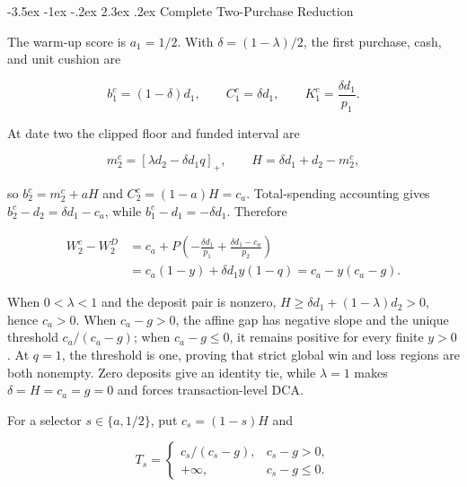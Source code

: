 \documentclass[12pt,a4paper,oneside]{report}
\makeatletter
\renewcommand\section{\@startsection{section}{1}{\z@}%
  {-3.5ex \@plus -1ex \@minus -.2ex}%
  {2.3ex \@plus .2ex}%
  {\normalfont\fontsize{14}{17}\selectfont\bfseries}}
\makeatother
\begin{document}
\section{Complete Two-Purchase Reduction}
\label{sec:appendix-two-purchase}

The warm-up score is $a_1=1/2$. With
$\delta=(1-\lambda)/2$, the first purchase, cash, and unit cushion are

\begin{equation}
  b_1^c=(1-\delta)d_1,
  \qquad C_1^c=\delta d_1,
  \qquad K_1^c=\frac{\delta d_1}{p_1}.
  \label{eq:appendix-two-first-state}
\end{equation}

At date two the clipped floor and funded interval are

\begin{equation}
  m_2^c=\left[\lambda d_2-\delta d_1q\right]_+,
  \qquad H=\delta d_1+d_2-m_2^c,
  \label{eq:appendix-two-floor}
\end{equation}

so $b_2^c=m_2^c+aH$ and $C_2^c=(1-a)H=c_a$. Total-spending
accounting gives $b_2^c-d_2=\delta d_1-c_a$, while
$b_1^c-d_1=-\delta d_1$. Therefore

\begin{align}
  W_2^c-W_2^D
  &=c_a+P\left(-\frac{\delta d_1}{p_1}
       +\frac{\delta d_1-c_a}{p_2}\right) \\
  &=c_a(1-y)+\delta d_1y(1-q)
   =c_a-y(c_a-g).
  \label{eq:appendix-two-gap}
\end{align}

When $0<\lambda<1$ and the deposit pair is nonzero,
$H\geq\delta d_1+(1-\lambda)d_2>0$, hence $c_a>0$. When $c_a-g>0$,
the affine gap has negative slope and the unique threshold $c_a/(c_a-g)$;
when $c_a-g\leq0$, it remains positive for every finite $y>0$. At $q=1$, the
threshold is one, proving that strict global win and loss regions are both
nonempty. Zero deposits give an identity tie, while $\lambda=1$ makes
$\delta=H=c_a=g=0$ and forces transaction-level DCA.

For a selector $s\in\{a,1/2\}$, put $c_s=(1-s)H$ and

\begin{equation}
  T_s=\begin{cases}
    c_s/(c_s-g),&c_s-g>0,\\
    +\infty,&c_s-g\leq0.
  \end{cases}
  \label{eq:appendix-two-extended-threshold}
\end{equation}
\end{document}
